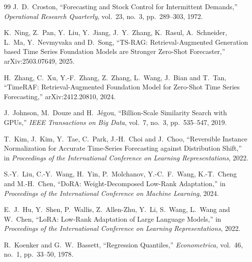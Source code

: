 \documentclass[twocolumn, lastpage]{jarticle}
\begin{document}
\begin{thebibliography}{99}
J.~D.~Croston,
``Forecasting and Stock Control for Intermittent Demands,''
\textit{Operational Research Quarterly}, vol.~23, no.~3, pp.~289--303, 1972.

K.~Ning, Z.~Pan, Y.~Liu, Y.~Jiang, J.~Y.~Zhang, K.~Rasul, A.~Schneider, L.~Ma, Y.~Nevmyvaka and D.~Song,
``TS-RAG: Retrieval-Augmented Generation based Time Series Foundation Models are Stronger Zero-Shot Forecaster,''
arXiv:2503.07649, 2025.

H.~Zhang, C.~Xu, Y.-F.~Zhang, Z.~Zhang, L.~Wang, J.~Bian and T.~Tan,
``{TimeRAF}: Retrieval-Augmented Foundation Model for Zero-Shot Time Series Forecasting,''
arXiv:2412.20810, 2024.

J.~Johnson, M.~Douze and H.~J\'{e}gou,
``Billion-Scale Similarity Search with {GPU}s,''
\textit{IEEE Transactions on Big Data}, vol.~7, no.~3, pp.~535--547, 2019.

T.~Kim, J.~Kim, Y.~Tae, C.~Park, J.-H.~Choi and J.~Choo,
``Reversible Instance Normalization for Accurate Time-Series Forecasting against Distribution Shift,''
in \textit{Proceedings of the International Conference on Learning Representations}, 2022.

S.-Y.~Liu, C.-Y.~Wang, H.~Yin, P.~Molchanov, Y.-C.~F.~Wang, K.-T.~Cheng and M.-H.~Chen,
``{DoRA}: Weight-Decomposed Low-Rank Adaptation,''
in \textit{Proceedings of the International Conference on Machine Learning}, 2024.

E.~J.~Hu, Y.~Shen, P.~Wallis, Z.~Allen-Zhu, Y.~Li, S.~Wang, L.~Wang and W.~Chen,
``{LoRA}: Low-Rank Adaptation of Large Language Models,''
in \textit{Proceedings of the International Conference on Learning Representations}, 2022.

R.~Koenker and G.~W.~Bassett,
``Regression Quantiles,''
\textit{Econometrica}, vol.~46, no.~1, pp.~33--50, 1978.

\end{thebibliography}
\end{document}
